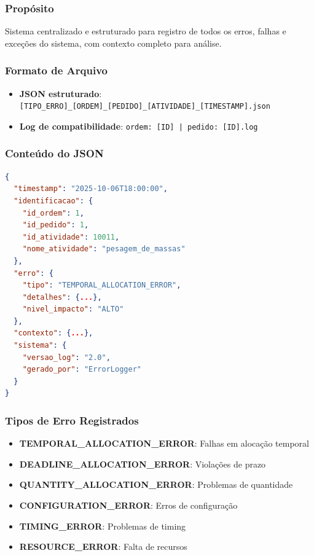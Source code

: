 \documentclass[11pt,a4paper]{article}
\begin{document}
\subsubsection{Propósito}

Sistema centralizado e estruturado para registro de todos os erros, falhas e exceções do sistema, com contexto completo para análise.

\subsubsection{Formato de Arquivo}

\begin{itemize}
    \item \textbf{JSON estruturado}: \texttt{[TIPO\_ERRO]\_[ORDEM]\_[PEDIDO]\_[ATIVIDADE]\_[TIMESTAMP].json}
    \item \textbf{Log de compatibilidade}: \texttt{ordem: [ID] | pedido: [ID].log}
\end{itemize}

\subsubsection{Conteúdo do JSON}

\begin{tcolorbox}[colback=codebg,colframe=logred,title=Estrutura de Erro JSON]
\begin{lstlisting}[language=json]
{
  "timestamp": "2025-10-06T18:00:00",
  "identificacao": {
    "id_ordem": 1,
    "id_pedido": 1,
    "id_atividade": 10011,
    "nome_atividade": "pesagem_de_massas"
  },
  "erro": {
    "tipo": "TEMPORAL_ALLOCATION_ERROR",
    "detalhes": {...},
    "nivel_impacto": "ALTO"
  },
  "contexto": {...},
  "sistema": {
    "versao_log": "2.0",
    "gerado_por": "ErrorLogger"
  }
}
\end{lstlisting}
\end{tcolorbox}

\subsubsection{Tipos de Erro Registrados}

\begin{itemize}[leftmargin=2cm]
    \item \textbf{TEMPORAL\_ALLOCATION\_ERROR}: Falhas em alocação temporal
    \item \textbf{DEADLINE\_ALLOCATION\_ERROR}: Violações de prazo
    \item \textbf{QUANTITY\_ALLOCATION\_ERROR}: Problemas de quantidade
    \item \textbf{CONFIGURATION\_ERROR}: Erros de configuração
    \item \textbf{TIMING\_ERROR}: Problemas de timing
    \item \textbf{RESOURCE\_ERROR}: Falta de recursos
\end{itemize}
\end{document}
